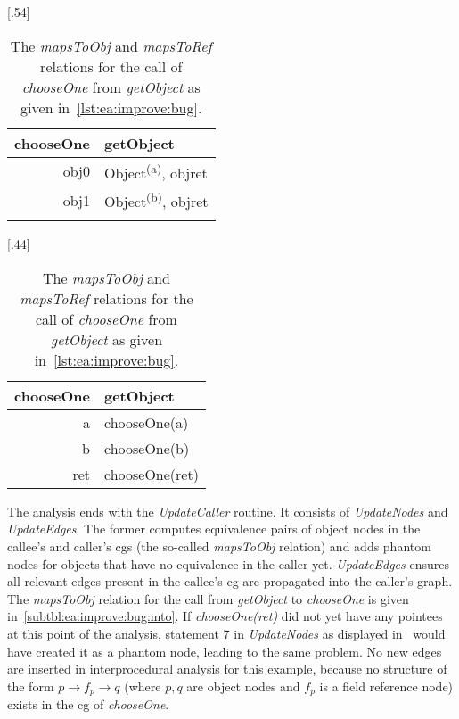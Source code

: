 			\begin{table}
				\centering
				{%
						\centering%
						\begin{tabular}{rl}
							\textbf{chooseOne} & \textbf{getObject} \\\hline\hline
							obj0 & Object\textsuperscript{(a)}, objret\\
							obj1 & Object\textsuperscript{(b)}, objret\\ \\
						\end{tabular}%
				}%
				\hspace{\fill}%
				{%
						\centering%
						\begin{tabular}{rl}
							\textbf{chooseOne} & \textbf{getObject} \\\hline\hline
							a   & chooseOne(a)\\
							b   & chooseOne(b)\\
							ret & chooseOne(ret)
						\end{tabular}%
				}%
				\caption[%
					The \emph{mapsToObj} and \emph{mapsToRef} relations for the call of \emph{chooseOne} from \emph{getObject}]{%
					The \emph{mapsToObj} and \emph{mapsToRef} relations for the call of \emph{chooseOne} from \emph{getObject} as
					given in~\cref{lst:ea:improve:bug}.}
				\label{tbl:ea:improve:bug:mapsTo}
			\end{table}

			The analysis ends with the \emph{UpdateCaller} routine. It consists of \emph{UpdateNodes} and \emph{UpdateEdges}.
			The former computes equivalence pairs of object nodes in the callee's and caller's \glspl{cg} (the so-called
			\emph{mapsToObj} relation) and adds phantom nodes for objects that have no equivalence in the caller yet.
			\emph{UpdateEdges} ensures all relevant edges present in the callee's \gls{cg} are propagated into the caller's
			graph. The \emph{mapsToObj} relation for the call from \emph{getObject} to \emph{chooseOne} is given
			in~\cref{subtbl:ea:improve:bug:mto}. If \emph{chooseOne(ret)} did not yet have any pointees at this point of the
			analysis, statement 7 in \emph{UpdateNodes} as displayed in~\cite[Fig.~7]{choi:03:toplas} would have created it as
			a phantom node, leading to the same problem. No new edges are inserted in interprocedural analysis for this
			example, because no structure of the form $p \rightarrow f_p \rightarrow q$ (where $p, q$ are object nodes and
			$f_p$ is a field reference node) exists in the \gls{cg} of \emph{chooseOne}.


